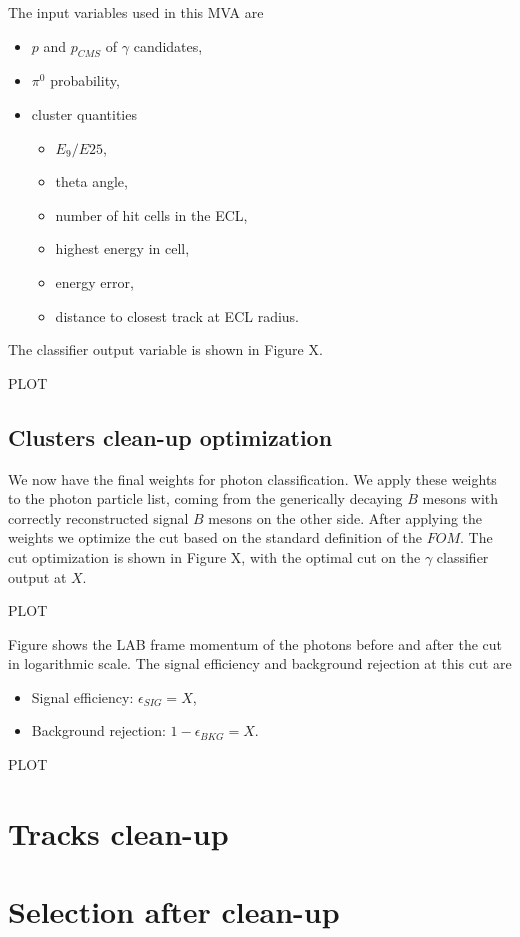 \documentclass[oneside,a4paper,openany,12pt]{scrbook}
\begin{document}
The input variables used in this MVA are
\begin{itemize}
\item $p$ and $p_{CMS}$ of $\gamma$ candidates,
\item $\pi^0$ probability,
\item cluster quantities
	\begin{itemize}
	\item $E_9/E{25}$,
	\item theta angle,
	\item number of hit cells in the ECL,
	\item highest energy in cell,
	\item energy error,
	\item distance to closest track at ECL radius.
	\end{itemize}
\end{itemize}

The classifier output variable is shown in Figure X.

\begin{center}
PLOT
\end{center}

\subsection{Clusters clean-up optimization}

We now have the final weights for photon classification. We apply these weights to the photon particle list, coming from the generically decaying $B$ mesons with correctly reconstructed signal $B$ mesons on the other side. After applying the weights we optimize the cut based on the standard definition of the $FOM$. The cut optimization is shown in Figure X, with the optimal cut on the $\gamma$ classifier output at $X$.

\begin{center}
PLOT
\end{center}

Figure shows the LAB frame momentum of the photons before and after the cut in logarithmic scale. The signal efficiency and background rejection at this cut are
\begin{itemize}
\item Signal efficiency: $\epsilon_{SIG} = X$,
\item Background rejection: $1-\epsilon_{BKG} = X$.
\end{itemize}

\begin{center}
PLOT
\end{center}

\section{Tracks clean-up}


\section{Selection after clean-up}
\end{document}
